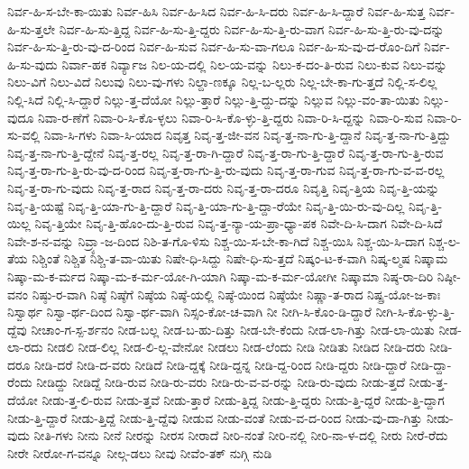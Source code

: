 {ನಿರ್ವ-ಹಿ-ಸ-ಬೇ-ಕಾ-ಯಿತು
ನಿರ್ವ-ಹಿಸಿ
ನಿರ್ವ-ಹಿ-ಸಿದ
ನಿರ್ವ-ಹಿ-ಸಿ-ದರು
ನಿರ್ವ-ಹಿ-ಸಿ-ದ್ದಾರೆ
ನಿರ್ವ-ಹಿ-ಸುತ್ತ
ನಿರ್ವ-ಹಿ-ಸು-ತ್ತಲೇ
ನಿರ್ವ-ಹಿ-ಸು-ತ್ತಿದ್ದ
ನಿರ್ವ-ಹಿ-ಸು-ತ್ತಿ-ದ್ದರು
ನಿರ್ವ-ಹಿ-ಸು-ತ್ತಿ-ರು-ವಾಗ
ನಿರ್ವ-ಹಿ-ಸು-ತ್ತಿ-ರು-ವು-ದನ್ನು
ನಿರ್ವ-ಹಿ-ಸು-ತ್ತಿ-ರು-ವು-ದ-ರಿಂದ
ನಿರ್ವ-ಹಿ-ಸುವ
ನಿರ್ವ-ಹಿ-ಸು-ವಾ-ಗಲೂ
ನಿರ್ವ-ಹಿ-ಸು-ವು-ದ-ರೊಂ-ದಿಗೆ
ನಿರ್ವ-ಹಿ-ಸು-ವುದು
ನಿರ್ವಾ-ಹಕ
ನಿರ್ವ್ಯಾಜ
ನಿಲ-ಯ-ದಲ್ಲಿ
ನಿಲ-ಯ-ವನ್ನು
ನಿಲು-ಕ-ದಂ-ತಿ-ರುವ
ನಿಲು-ಕುವ
ನಿಲು-ವನ್ನು
ನಿಲು-ವಿಗೆ
ನಿಲು-ವಿದೆ
ನಿಲುವು
ನಿಲು-ವು-ಗಳು
ನಿಲ್ದಾ-ಣಕ್ಕೂ
ನಿಲ್ಲ-ಬ-ಲ್ಲರು
ನಿಲ್ಲ-ಬೇ-ಕಾ-ಗು-ತ್ತದೆ
ನಿಲ್ಲಿ-ಸ-ಲಿಲ್ಲ
ನಿಲ್ಲಿ-ಸಿದೆ
ನಿಲ್ಲಿ-ಸಿ-ದ್ದಾರೆ
ನಿಲ್ಲು-ತ್ತ-ದೆಯೋ
ನಿಲ್ಲು-ತ್ತಾರೆ
ನಿಲ್ಲು-ತ್ತಿ-ದ್ದು-ದನ್ನು
ನಿಲ್ಲುವ
ನಿಲ್ಲು-ವಂ-ತಾ-ಯಿತು
ನಿಲ್ಲು-ವುದೂ
ನಿವಾ-ರ-ಣೆಗೆ
ನಿವಾ-ರಿ-ಸಿ-ಕೊ-ಳ್ಳಲು
ನಿವಾ-ರಿ-ಸಿ-ಕೊ-ಳ್ಳು-ತ್ತಿ-ದ್ದರು
ನಿವಾ-ರಿ-ಸಿ-ದ್ದನ್ನು
ನಿವಾ-ರಿ-ಸುವ
ನಿವಾ-ರಿ-ಸು-ವಲ್ಲಿ
ನಿವಾ-ಸಿ-ಗಳು
ನಿವಾ-ಸಿ-ಯಾದ
ನಿವೃತ್ತ
ನಿವೃ-ತ್ತ-ಜೀ-ವನ
ನಿವೃ-ತ್ತ-ನಾ-ಗು-ತ್ತಿ-ದ್ದಾನೆ
ನಿವೃ-ತ್ತ-ನಾ-ಗು-ತ್ತಿದ್ದು
ನಿವೃ-ತ್ತ-ನಾ-ಗು-ತ್ತಿ-ದ್ದೇನೆ
ನಿವೃ-ತ್ತ-ರಲ್ಲ
ನಿವೃ-ತ್ತ-ರಾ-ಗಿ-ದ್ದಾರೆ
ನಿವೃ-ತ್ತ-ರಾ-ಗು-ತ್ತಿ-ದ್ದಾರೆ
ನಿವೃ-ತ್ತ-ರಾ-ಗು-ತ್ತಿ-ರುವ
ನಿವೃ-ತ್ತ-ರಾ-ಗು-ತ್ತಿ-ರು-ವು-ದ-ರಿಂದ
ನಿವೃ-ತ್ತ-ರಾ-ಗು-ತ್ತಿ-ರು-ವುದು
ನಿವೃ-ತ್ತ-ರಾ-ಗುವ
ನಿವೃ-ತ್ತ-ರಾ-ಗು-ವ-ವ-ರಲ್ಲ
ನಿವೃ-ತ್ತ-ರಾ-ಗು-ವುದು
ನಿವೃ-ತ್ತ-ರಾದ
ನಿವೃ-ತ್ತ-ರಾ-ದರು
ನಿವೃ-ತ್ತ-ರಾ-ದರೂ
ನಿವೃತ್ತಿ
ನಿವೃ-ತ್ತಿಯ
ನಿವೃ-ತ್ತಿ-ಯನ್ನು
ನಿವೃ-ತ್ತಿ-ಯಷ್ಟೆ
ನಿವೃ-ತ್ತಿ-ಯಾ-ಗು-ತ್ತಿ-ದ್ದಾರೆ
ನಿವೃ-ತ್ತಿ-ಯಾ-ಗು-ತ್ತಿ-ದ್ದಾ-ರೆಯೇ
ನಿವೃ-ತ್ತಿ-ಯಿ-ರು-ವು-ದಿಲ್ಲ
ನಿವೃ-ತ್ತಿ-ಯಿಲ್ಲ
ನಿವೃ-ತ್ತಿಯೇ
ನಿವೃ-ತ್ತಿ-ಹೊಂ-ದು-ತ್ತಿ-ರುವ
ನಿವೃ-ತ್ತ-ನ್ಯಾ-ಯ-ಪ್ರಾ-ಧ್ಯಾ-ಪಕ
ನಿವೇ-ದಿ-ಸಿ-ದಾಗ
ನಿವೇ-ದಿ-ಸಿದೆ
ನಿವೇ-ಶ-ನ-ವನ್ನು
ನಿವ್ರ್ಯಾ-ಜ-ದಿಂದ
ನಿಶಿ-ತ-ಗೊ-ಳಿಸು
ನಿಶ್ಚ-ಯಿ-ಸ-ಬೇ-ಕಾ-ಗಿದೆ
ನಿಶ್ಚ-ಯಿಸಿ
ನಿಶ್ಚ-ಯಿ-ಸಿ-ದಾಗ
ನಿಶ್ಚ-ಲ-ತೆಯ
ನಿಶ್ಚಿಂತೆ
ನಿಶ್ಚಿತ
ನಿಶ್ಚಿ-ತ-ವಾ-ಯಿತು
ನಿಷೇ-ಧಿ-ಸಿದ್ದು
ನಿಷೇ-ಧಿ-ಸು-ತ್ತದೆ
ನಿಷ್ಕಂ-ಟ-ಕ-ವಾಗಿ
ನಿಷ್ಕ-ಲ್ಮಷ
ನಿಷ್ಕಾಮ
ನಿಷ್ಕಾ-ಮ-ಕ-ರ್ಮದ
ನಿಷ್ಕಾ-ಮ-ಕ-ರ್ಮ-ಯೋ-ಗಿ-ಯಾಗಿ
ನಿಷ್ಕಾ-ಮ-ಕ-ರ್ಮ-ಯೋಗೀ
ನಿಷ್ಕಾಮಾ
ನಿಷ್ಠ-ರಾ-ದಿರಿ
ನಿಷ್ಠೀ-ವನಂ
ನಿಷ್ಠು-ರ-ವಾಗಿ
ನಿಷ್ಠೆ
ನಿಷ್ಠೆಗೆ
ನಿಷ್ಠೆಯ
ನಿಷ್ಠೆ-ಯಲ್ಲಿ
ನಿಷ್ಠೆ-ಯಿಂದ
ನಿಷ್ಠೆಯೇ
ನಿಷ್ಣಾ-ತ-ರಾದ
ನಿಷ್ಪ್ರ-ಯೋ-ಜ-ಕಾಃ
ನಿಸ್ವಾರ್ಥ
ನಿಸ್ವಾ-ರ್ಥ-ದಿಂದ
ನಿಸ್ವಾ-ರ್ಥ-ವಾಗಿ
ನಿಸ್ಸಂ-ಕೋ-ಚ-ವಾಗಿ
ನೀ
ನೀಗಿ-ಸಿ-ಕೊಂ-ಡಿ-ದ್ದಾರೆ
ನೀಗಿ-ಸಿ-ಕೊ-ಳ್ಳು-ತ್ತಿ-ದ್ದೆವು
ನೀಚಾಂ-ಗ-ಸ್ಪ-ರ್ಶನಂ
ನೀಡ-ಬಲ್ಲ
ನೀಡ-ಬ-ಹು-ದಿತ್ತು
ನೀಡ-ಬೇ-ಕೆಂದು
ನೀಡ-ಲಾ-ಗಿತ್ತು
ನೀಡ-ಲಾ-ಯಿತು
ನೀಡ-ಲಾ-ರದು
ನೀಡಲಿ
ನೀಡ-ಲಿಲ್ಲ
ನೀಡ-ಲಿ-ಲ್ಲ-ವೇನೋ
ನೀಡಲು
ನೀಡ-ಲೆಂದು
ನೀಡಿ
ನೀಡಿತು
ನೀಡಿದ
ನೀಡಿ-ದರು
ನೀಡಿ-ದರೂ
ನೀಡಿ-ದರೆ
ನೀಡಿ-ದ-ವರು
ನೀಡಿದೆ
ನೀಡಿ-ದ್ದಕ್ಕೆ
ನೀಡಿ-ದ್ದನ್ನ
ನೀಡಿ-ದ್ದ-ರಿಂದ
ನೀಡಿ-ದ್ದರು
ನೀಡಿ-ದ್ದಾರೆ
ನೀಡಿ-ದ್ದಾ-ರೆಂದು
ನೀಡಿದ್ದು
ನೀಡಿದ್ದೆ
ನೀಡಿ-ರುವ
ನೀಡಿ-ರು-ವರು
ನೀಡಿ-ರು-ವ-ವ-ರನ್ನು
ನೀಡಿ-ರು-ವುದು
ನೀಡು-ತ್ತದೆ
ನೀಡು-ತ್ತ-ದೆಯೋ
ನೀಡು-ತ್ತ-ಲಿ-ರುವ
ನೀಡು-ತ್ತವೆ
ನೀಡು-ತ್ತಾರೆ
ನೀಡು-ತ್ತಿದ್ದ
ನೀಡು-ತ್ತಿ-ದ್ದರು
ನೀಡು-ತ್ತಿ-ದ್ದರೆ
ನೀಡು-ತ್ತಿ-ದ್ದಾಗ
ನೀಡು-ತ್ತಿ-ದ್ದಾರೆ
ನೀಡು-ತ್ತಿದ್ದೆ
ನೀಡು-ತ್ತಿ-ದ್ದೆವು
ನೀಡುವ
ನೀಡು-ವಂತೆ
ನೀಡು-ವ-ದ-ರಿಂದ
ನೀಡು-ವು-ದಾ-ಗಿತ್ತು
ನೀಡು-ವುದು
ನೀತಿ-ಗಳು
ನೀನು
ನೀನೆ
ನೀರನ್ನು
ನೀರಸ
ನೀರಾದೆ
ನೀರಿ-ನಂತೆ
ನೀರಿ-ನಲ್ಲಿ
ನೀರಿ-ನಾ-ಳ-ದಲ್ಲಿ
ನೀರು
ನೀರೆ-ರೆದು
ನೀರೇ
ನೀರೋ-ಗ-ವನ್ನೂ
ನೀಲ್ಗ-ಡಲು
ನೀವು
ನೀವೆಂ-ತಕ್
ನುಗ್ಗಿ
ನುಡಿ
}
